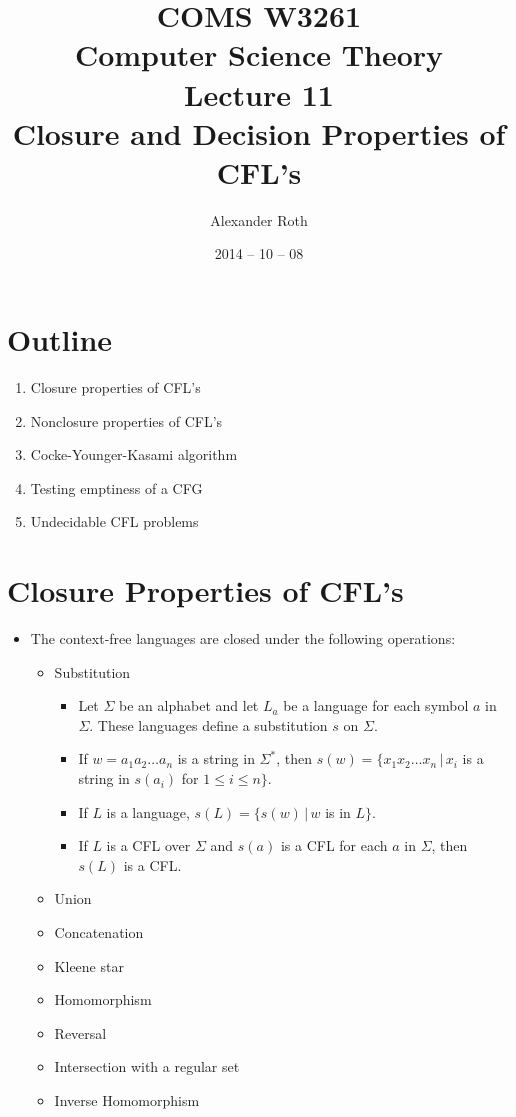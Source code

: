 \documentclass[]{article}
\begin{document}
\newcommand*{\xml}[1]{\texttt{<#1>}}
\theoremstyle{definition}
\newtheorem{thm}{Theorem}

\title{COMS W3261 \\ Computer Science Theory \\ Lecture 11\\ Closure and 
Decision Properties of CFL's}
\author{Alexander Roth}
\date{2014 -- 10 -- 08}
\maketitle

\section*{Outline}
  \begin{enumerate}
    \item Closure properties of CFL's
    \item Nonclosure properties of CFL's
    \item Cocke-Younger-Kasami algorithm
    \item Testing emptiness of a CFG
    \item Undecidable CFL problems
  \end{enumerate}
  
\section{Closure Properties of CFL's}
  \begin{itemize}
    \item The context-free languages are closed under the following operations:
      \begin{itemize}
        \item Substitution
          \begin{itemize}
            \item Let $\Sigma$ be an alphabet and let $L_a$ be a language for 
            each symbol $a$ in $\Sigma$. These languages define a substitution 
            $s$ on $\Sigma$.
            \item If $w = a_1a_2\ldots{}a_n$ is a string in $\Sigma^*$, then
            $s(w) = \{ x_1x_2\ldots{}x_n \, | \, x_i$ is a string in $s(a_i)$ 
            for $1 \leq i \leq n \}$.
            \item If $L$ is a language, $s(L) = \{s(w)\,|\,w$ is in $L \}$.
            \item If $L$ is a CFL over $\Sigma$ and $s(a)$ is a CFL for each 
            $a$ in $\Sigma$, then $s(L)$ is a CFL.
          \end{itemize}
        \item Union
        \item Concatenation
        \item Kleene star
        \item Homomorphism
        \item Reversal
        \item Intersection with a regular set
        \item Inverse Homomorphism
      \end{itemize}
  \end{itemize}
  
\end{document}
